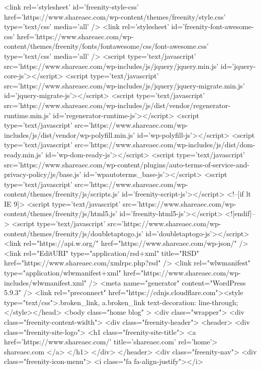 {<link rel='stylesheet' id='freenity-style-css'  href='https://www.shareaec.com/wp-content/themes/freenity/style.css' type='text/css' media='all' />
<link rel='stylesheet' id='freenity-font-awesome-css'  href='https://www.shareaec.com/wp-content/themes/freenity/fonts/fontawesome/css/font-awesome.css' type='text/css' media='all' />
<script type='text/javascript' src='https://www.shareaec.com/wp-includes/js/jquery/jquery.min.js' id='jquery-core-js'></script>
<script type='text/javascript' src='https://www.shareaec.com/wp-includes/js/jquery/jquery-migrate.min.js' id='jquery-migrate-js'></script>
<script type='text/javascript' src='https://www.shareaec.com/wp-includes/js/dist/vendor/regenerator-runtime.min.js' id='regenerator-runtime-js'></script>
<script type='text/javascript' src='https://www.shareaec.com/wp-includes/js/dist/vendor/wp-polyfill.min.js' id='wp-polyfill-js'></script>
<script type='text/javascript' src='https://www.shareaec.com/wp-includes/js/dist/dom-ready.min.js' id='wp-dom-ready-js'></script>
<script type='text/javascript' src='https://www.shareaec.com/wp-content/plugins/auto-terms-of-service-and-privacy-policy/js/base.js' id='wpautoterms_base-js'></script>
<script type='text/javascript' src='https://www.shareaec.com/wp-content/themes/freenity/js/scripts.js' id='freenity-script-js'></script>
<!--[if lt IE 9]>
<script type='text/javascript' src='https://www.shareaec.com/wp-content/themes/freenity/js/html5.js' id='freenity-html5-js'></script>
<![endif]-->
<script type='text/javascript' src='https://www.shareaec.com/wp-content/themes/freenity/js/doubletaptogo.js' id='doubletaptogo-js'></script>
<link rel="https://api.w.org/" href="https://www.shareaec.com/wp-json/" /><link rel="EditURI" type="application/rsd+xml" title="RSD" href="https://www.shareaec.com/xmlrpc.php?rsd" />
<link rel="wlwmanifest" type="application/wlwmanifest+xml" href="https://www.shareaec.com/wp-includes/wlwmanifest.xml" /> 
<meta name="generator" content="WordPress 5.9.3" />
<link rel="preconnect" href="https://cdnjs.cloudflare.com"><style type="text/css">.broken_link, a.broken_link {
	text-decoration: line-through;
}</style></head>
<body class="home blog" >
<div class="wrapper">
	<div class="freenity-content-width">
		<div class="freenity-header">
			<header>
				<div class="freenity-site-logo">
					<h1 class="freenity-site-title">
												<a href='https://www.shareaec.com/' title='shareaec.com' rel='home'>
							shareaec.com						</a>
					</h1>
				</div>
			</header>
			<div class="freenity-nav">
				<div class="freenity-icon-menu">
					<i class="fa fa-align-justify"></i>
}
